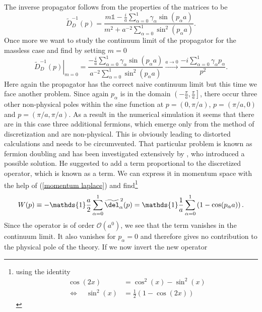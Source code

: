 The inverse propagator follows from the properties of the  matrices to be
\begin{equation}
\widetilde{D}_{D}^{-1}(p) = \dfrac{m\mathds{1} - \tfrac{i}{a}\sum_{\alpha=0}^{1} \gamma_{\alpha} \sin (p_{\alpha}a)}{ m^2 + a^{-2}\sum_{\alpha=0}^{1} \sin^2 (p_{\alpha}a)  }.
\end{equation}
Once more we want to study the continuum limit of the propagator for the massless case and find by setting $m=0$
\begin{equation}
\left.\widetilde{D}_{D}^{-1}(p)\right\vert_{m=0} =  \dfrac{- \tfrac{i}{a}\sum_{\alpha=0}^{1} \gamma_{\alpha} \sin (p_{\alpha}a)}{ a^{-2}\sum_{\alpha=0}^{1} \sin^2 (p_{\alpha}a)  } \xrightarrow{a \rightarrow 0} \dfrac{-i \sum_{\alpha=0}^{1} \gamma_{\alpha} p_{\alpha} }{p^2}.
\end{equation}
Here again the propagator has the correct naive continuum limit but this time we face another problem. Since again $p_{\alpha}$ is in the domain $\left(-\tfrac{\pi}{a},\tfrac{\pi}{a}\right]$, there occur three other non-physical poles within the sine function at $p=(0,\pi/a)$, $p=(\pi/a,0)$ and $p=(\pi/a,\pi/a)$. As a result in the numerical simulation it seems that there are in this case three additional fermions, which emerge only from the method of discretization and are  non-physical. This is obviously leading to distorted calculations and needs to be circumvented. That particular problem is known as fermion doubling and has been investigated extensively by , who introduced a possible solution.  He suggested to add a term proportional to the discretized  operator\cite{montvay_lattice}, which is known as a  term. We can express it in momentum space with the help of (\ref{momentum laplace}) and find\footnote{using the identity
\begin{align*}
\cos(2x)&=\cos^{2}(x) -\sin^{2}(x) \\
\Leftrightarrow\quad \sin^{2}(x) &= \tfrac{1}{2}\left(1-\cos(2x)\right)
\end{align*}
}
%
%
\begin{equation}
W(p)\equiv -\mathds{1}\dfrac{a}{2} \sum\limits_{\alpha=0}^{1} {\widetilde{\del}_\alpha}^{\,2}(p) = \mathds{1}\dfrac{1}{a}\sum\limits_{\alpha=0}^{1}\left( 1- \cos(p_{\alpha}a)\right).
\label{eq: wilson_op}
\end{equation}
Since the  operator is of order $\mathcal{O}(a^{0})$, we see that the  term vanishes in the continuum limit. It also vanishes for $p_{\alpha}=0$ and therefore gives no contribution to the physical pole of the theory. If we now invert the new  operator
